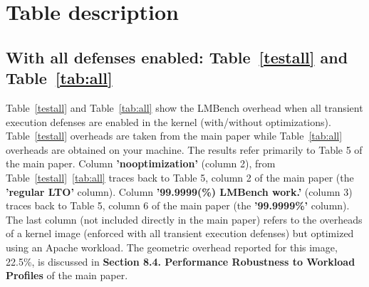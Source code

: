 \documentclass{article}
\begin{document}
\section{Table description}

\subsection{With all defenses enabled: Table~\ref{testall} and Table~\ref{tab:all}}
Table~\ref{testall} and Table~\ref{tab:all} show the LMBench overhead when all transient execution defenses are enabled
in the kernel (with/without optimizations). Table~\ref{testall} overheads are taken from the main paper while Table~\ref{tab:all}
overheads are obtained on your machine. The results refer primarily to Table 5 of the main paper.
Column \textbf{'nooptimization'} (column 2), from Table~\ref{testall}~\ref{tab:all} traces back to Table 5, column 2 of the main paper (the \textbf{'regular LTO'} column). 
Column \textbf{'99.9999(\%) LMBench work.'} (column 3) traces back to Table 5, column 6 of the main paper (the \textbf{'99.9999\%'} column). 
The last column (not included directly in the main paper) refers to the overheads of a kernel image (enforced with all transient execution defenses) 
but optimized using an Apache workload. The geometric overhead reported for this image, 22.5\%, 
is discussed in \textbf{Section 8.4. Performance Robustness to Workload Profiles} of the main paper.

\begin{table}[H]
\begin{center}
\begin{adjustbox}{width=0.5\textwidth}
\large

\end{adjustbox}
\end{center}
\label{testall} 
\end{table}
\begin{table}[H]
\begin{center}
\begin{adjustbox}{width=0.5\textwidth}
\large

\end{adjustbox}
\end{center}
\label{tab:all} 
\end{table}
\end{document}
